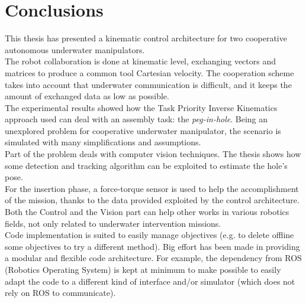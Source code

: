 \chapter{Conclusions}
\label{chap:conclusions}
\ifpdf
    \graphicspath{{Conclusions/Figures/PNG/}{Conclusions/Figures/PDF/}{Conclusions/Figures/}}
\else
    \graphicspath{{Conclusions/Figures/EPS/}{Conclusions/Figures/}}
\fi

This thesis has presented a kinematic control architecture for two cooperative autonomous underwater manipulators.\\
The robot collaboration is done at kinematic level, exchanging vectors and matrices to produce a common tool Cartesian velocity. The cooperation scheme takes into account that underwater communication is difficult, and it keeps the amount of exchanged data as low as possible.\\
The experimental results showed how the Task Priority Inverse Kinematics approach used can deal with an assembly task: the \textit{peg-in-hole}. Being an unexplored problem for cooperative underwater manipulator, the scenario is simulated with many simplifications and assumptions.\\
Part of the problem deals with computer vision techniques. The thesis shows how some detection and tracking algorithm can be exploited to estimate the hole's pose.\\
For the insertion phase, a force-torque sensor is used to help the accomplishment of the mission, thanks to the data provided exploited by the control architecture.\\
Both the Control and the Vision part can help other works in various robotics fields, not only related to underwater intervention missions.\\

Code implementation is suited to easily manage objectives (e.g. to delete offline some objectives to try a different method). Big effort has been made in providing a modular and flexible code architecture. For example, the dependency from ROS (Robotics Operating System) is kept at minimum to make possible to easily adapt the code to a different kind of interface and/or simulator (which does not rely on ROS to communicate).\\


